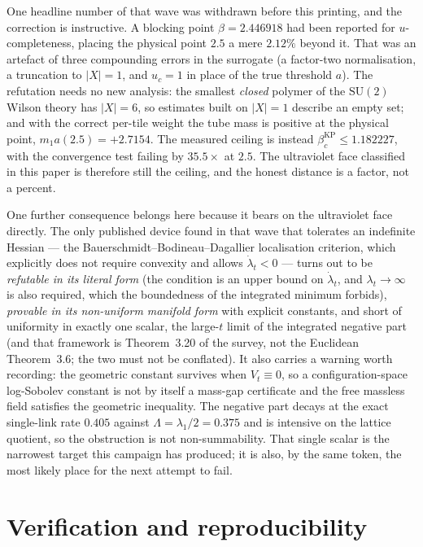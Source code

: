 \documentclass[11pt,a4paper]{article}
\begin{document}
One headline number of that wave was withdrawn before this printing, and the correction is
instructive. A blocking point $\beta=2.446918$ had been reported for $u$-completeness, placing the
physical point $2.5$ a mere $2.12\%$ beyond it. That was an artefact of three compounding errors in
the surrogate (a factor-two normalisation, a truncation to $|X|=1$, and $u_c=1$ in place of the true
threshold $a$). The refutation needs no new analysis: the smallest \emph{closed} polymer of the
$\mathrm{SU}(2)$ Wilson theory has $|X|=6$, so estimates built on $|X|=1$ describe an empty set; and
with the correct per-tile weight the tube mass is positive at the physical point,
$m_1a(2.5)=+2.7154$. The measured ceiling is instead $\beta_c^{\mathrm{KP}}\le1.182227$, with the
convergence test failing by $35.5\times$ at $2.5$. The ultraviolet face classified in this paper is
therefore still the ceiling, and the honest distance is a factor, not a percent.

One further consequence belongs here because it bears on the ultraviolet face directly. The only
published device found in that wave that tolerates an indefinite Hessian --- the Bauerschmidt--Bodineau--Dagallier
localisation criterion, which explicitly does not require convexity and allows $\dot\lambda_t<0$ ---
turns out to be \emph{refutable in its literal form} (the condition is an upper bound on
$\dot\lambda_t$, and $\lambda_t\to\infty$ is also required, which the boundedness of the integrated
minimum forbids), \emph{provable in its non-uniform manifold form} with explicit constants, and
short of uniformity in exactly one scalar, the large-$t$ limit of the integrated negative part (and
that framework is Theorem~3.20 of the survey, not the Euclidean Theorem~3.6; the two must not be
conflated). It also carries a warning worth recording: the geometric constant survives when
$V_t\equiv0$, so a configuration-space log-Sobolev constant is not by itself a mass-gap certificate
and the free massless field satisfies the geometric inequality. The
negative part decays at the exact single-link rate $0.405$ against $\Lambda=\lambda_1/2=0.375$ and is
intensive on the lattice quotient, so the obstruction is not non-summability. That single scalar is
the narrowest target this campaign has produced; it is also, by the same token, the most likely place
for the next attempt to fail.

\section{Verification and reproducibility}
\label{sec:verif}
\end{document}

